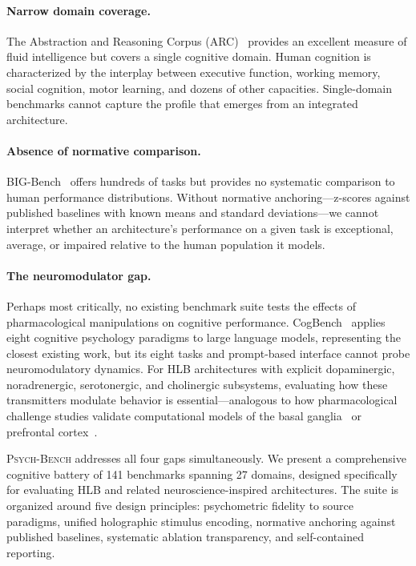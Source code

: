 \documentclass[11pt,letterpaper]{article}
\newcommand{\psychbench}{\textsc{Psych-Bench}}
\newcommand{\hlb}{\textsc{HLB}}
\begin{document}
\paragraph{Narrow domain coverage.} The Abstraction and Reasoning Corpus (ARC)~\citep{chollet2019measure} provides an excellent measure of fluid intelligence but covers a single cognitive domain. Human cognition is characterized by the interplay between executive function, working memory, social cognition, motor learning, and dozens of other capacities. Single-domain benchmarks cannot capture the profile that emerges from an integrated architecture.

\paragraph{Absence of normative comparison.} BIG-Bench~\citep{srivastava2023beyond} offers hundreds of tasks but provides no systematic comparison to human performance distributions. Without normative anchoring---z-scores against published baselines with known means and standard deviations---we cannot interpret whether an architecture's performance on a given task is exceptional, average, or impaired relative to the human population it models.

\paragraph{The neuromodulator gap.} Perhaps most critically, no existing benchmark suite tests the effects of pharmacological manipulations on cognitive performance. CogBench~\citep{codaforno2024cogbench} applies eight cognitive psychology paradigms to large language models, representing the closest existing work, but its eight tasks and prompt-based interface cannot probe neuromodulatory dynamics. For \hlb{} architectures with explicit dopaminergic, noradrenergic, serotonergic, and cholinergic subsystems, evaluating how these transmitters modulate behavior is essential---analogous to how pharmacological challenge studies validate computational models of the basal ganglia~\citep{doya2002metalearning} or prefrontal cortex~\citep{arnsten2011catecholamine}.

\psychbench{} addresses all four gaps simultaneously. We present a comprehensive cognitive battery of 141 benchmarks spanning 27 domains, designed specifically for evaluating \hlb{} and related neuroscience-inspired architectures. The suite is organized around five design principles: psychometric fidelity to source paradigms, unified holographic stimulus encoding, normative anchoring against published baselines, systematic ablation transparency, and self-contained reporting.
\end{document}
